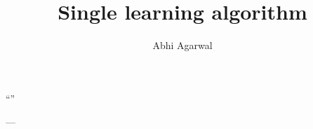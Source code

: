 \documentclass[11pt, oneside]{article}
\title{Single learning algorithm}
\author{Abhi Agarwal}
\date{}
\begin{document}
\maketitle

\par 

\epigraph{``''}{--- } 
\end{document}
